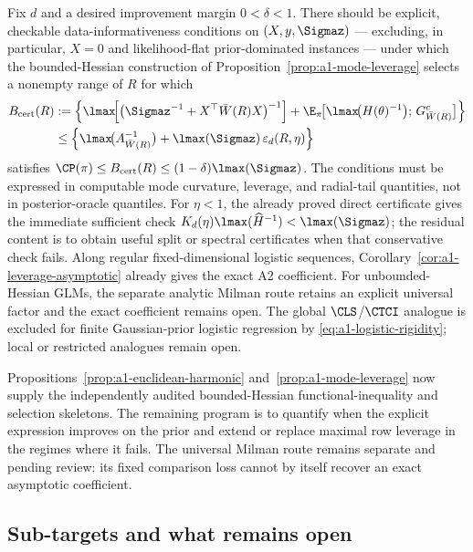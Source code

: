 \documentclass[../../main.tex]{subfiles}
\begin{document}
\begin{conjecture}
\label{conj:a1}
Fix $d$ and a desired improvement margin $0<\delta<1$. There should be explicit, checkable
data-informativeness conditions on $(X,y,\Sigmaz)$ --- excluding, in particular, $X=0$ and
likelihood-flat prior-dominated instances --- under which the bounded-Hessian construction of
Proposition~\ref{prop:a1-mode-leverage} selects a nonempty range of $R$ for which
\[
  \begin{aligned}
    B_{\rm cert}(R)
    &:=\Big\{\lmax\!\Big[\big(\Sigmaz^{-1}+X^\top\bar W(R)X\big)^{-1}\Big]
      +\E_\pi\!\big[\lmax\!\big(H(\theta)^{-1}\big);\,G_{\bar W(R)}^c\big]\Big\}\\
    &\le\Big\{\lmax\!\big(A_{\bar W(R)}^{-1}\big)
      +\lmax(\Sigmaz)\,\varepsilon_d(R,\eta)\Big\}
  \end{aligned}
\]
satisfies
$\CP(\pi)\le B_{\rm cert}(R)\le(1-\delta)\lmax(\Sigmaz)$. The conditions must be expressed in
computable mode curvature, leverage, and radial-tail quantities, not in posterior-oracle
quantiles. For $\eta<1$, the already proved direct certificate gives the immediate sufficient
check
$K_d(\eta)\lmax(\widehat H^{-1})<\lmax(\Sigmaz)$; the residual content is to obtain useful split
or spectral certificates when that conservative check fails. Along regular fixed-dimensional
logistic sequences, Corollary~\ref{cor:a1-leverage-asymptotic} already gives the exact A2
coefficient.
For unbounded-Hessian GLMs, the separate analytic Milman route retains an explicit universal
factor and the exact coefficient remains open. The global $\CLS$/$\CTCI$ analogue is excluded for finite
Gaussian-prior logistic regression by \eqref{eq:a1-logistic-rigidity}; local or restricted
analogues remain open.
\end{conjecture}

\noindent Propositions~\ref{prop:a1-euclidean-harmonic} and~\ref{prop:a1-mode-leverage} now supply
the independently audited bounded-Hessian functional-inequality and selection skeletons. The
remaining program is to quantify when the explicit expression improves on the prior and extend or
replace maximal row leverage in the regimes where it fails. The universal Milman route remains
separate and pending review: its fixed comparison loss cannot by itself recover an exact
asymptotic coefficient.

\subsection{Sub-targets and what remains open}
\label{subsec:a1-open}
\end{document}
